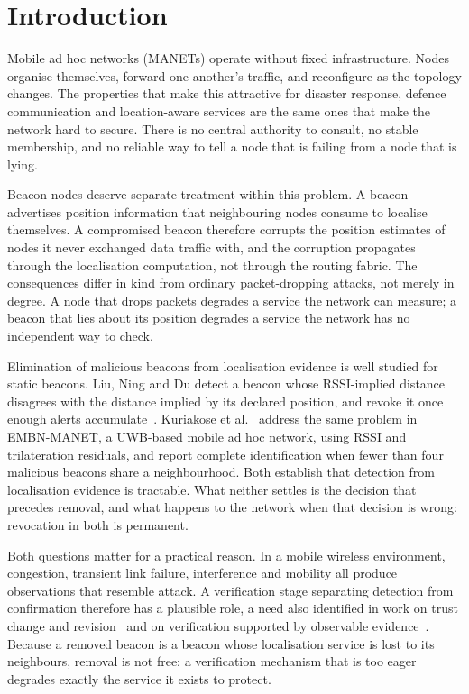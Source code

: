 \section{Introduction}

Mobile ad hoc networks (MANETs) operate without fixed infrastructure. Nodes
organise themselves, forward one another's traffic, and reconfigure as the
topology changes. The properties that make this attractive for disaster
response, defence communication and location-aware services are the same
ones that make the network hard to secure. There is no central authority to
consult, no stable membership, and no reliable way to tell a node that is
failing from a node that is lying.

Beacon nodes deserve separate treatment within this problem. A beacon
advertises position information that neighbouring nodes consume to
localise themselves. A compromised beacon therefore corrupts the position
estimates of nodes it never exchanged data traffic with, and the corruption
propagates through the localisation computation, not through the
routing fabric. The consequences differ in kind from ordinary
packet-dropping attacks, not merely in degree. A node that drops packets
degrades a service the network can measure; a beacon that lies about its
position degrades a service the network has no independent way to check.

Elimination of malicious beacons from localisation evidence is well studied
for static beacons. Liu, Ning and Du detect a beacon whose RSSI-implied
distance disagrees with the distance implied by its declared position, and
revoke it once enough alerts accumulate~\cite{liu2005detecting}. Kuriakose
et al.~\cite{kuriakose2023embn} address the same problem in EMBN-MANET, a
UWB-based mobile ad hoc network, using RSSI and trilateration residuals, and
report complete identification when fewer than four malicious beacons share
a neighbourhood. Both establish that detection from localisation evidence is
tractable. What neither settles is the decision that precedes removal, and
what happens to the network when that decision is wrong: revocation in both
is permanent.

Both questions matter for a practical reason. In a mobile wireless
environment, congestion, transient link failure, interference and mobility
all produce observations that resemble attack. A verification stage
separating detection from confirmation therefore has a plausible role, a
need also identified in work on trust change and revision~\cite{chatzidakis2022trust}
and on verification supported by observable evidence~\cite{li2019dapv,ryu2023reputation}.
Because a removed beacon is a beacon whose localisation service is lost
to its neighbours, removal is not free: a verification mechanism that is too
eager degrades exactly the service it exists to protect.

